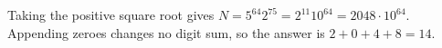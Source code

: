 Taking the positive square root gives $N=5^{64}2^{75}=2^{11}10^{64}=2048\cdot10^{64}$. Appending zeroes changes no digit sum, so the answer is $2+0+4+8=\boxed{14}$.
